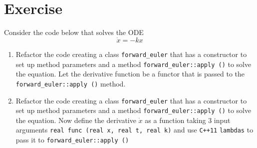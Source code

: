 \section*{Exercise}

Consider the code below that solves the ODE 
\[
\dot{x} = - k x
\]



\begin{enumerate}

\item Refactor the code creating a class 
{\tt forward\_euler} 
that has a constructor to set up method parameters and a method 
{\tt forward\_euler::apply ()} 
to solve the equation.
Let the derivative function be a functor that is passed to the 
{\tt forward\_euler::apply ()}
method.

\item Refactor the code creating a class 
{\tt forward\_euler} 
that has a constructor to set up method parameters and a method 
{\tt forward\_euler::apply ()}  
to solve the equation.
Now define the derivative $\dot x$ as a function taking 3 input arguments 
{\tt real func (real x, real t, real k)} and use {\tt C++11} {\tt lambdas} 
to pass it to {\tt forward\_euler::apply ()}
  
\end{enumerate}


